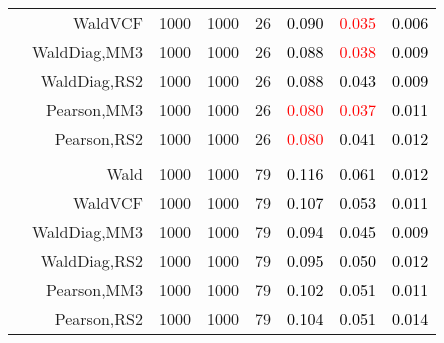 \documentclass[
]{article}
\begin{document}
\begin{table}[H]
{\begin{tabular}[t]{lrrrrrrr}
\hspace{1em} & WaldVCF & 1000 & 1000 & 26 & \textcolor{black}{0.090} & \textcolor{red}{0.035} & \textcolor{black}{0.006}\\

\hspace{1em} & WaldDiag,MM3 & 1000 & 1000 & 26 & \textcolor{black}{0.088} & \textcolor{red}{0.038} & \textcolor{black}{0.009}\\

\hspace{1em} & WaldDiag,RS2 & 1000 & 1000 & 26 & \textcolor{black}{0.088} & \textcolor{black}{0.043} & \textcolor{black}{0.009}\\

\hspace{1em} & Pearson,MM3 & 1000 & 1000 & 26 & \textcolor{red}{0.080} & \textcolor{red}{0.037} & \textcolor{black}{0.011}\\

\hspace{1em} & Pearson,RS2 & 1000 & 1000 & 26 & \textcolor{red}{0.080} & \textcolor{black}{0.041} & \textcolor{black}{0.012}\\
\cmidrule{1-8}
\addlinespace[0.3em]
\multicolumn{8}{l}{\textbf{3F 15V}}\\
\hspace{1em} & Wald & 1000 & 1000 & 79 & \textcolor{black}{0.116} & \textcolor{black}{0.061} & \textcolor{black}{0.012}\\

\hspace{1em} & WaldVCF & 1000 & 1000 & 79 & \textcolor{black}{0.107} & \textcolor{black}{0.053} & \textcolor{black}{0.011}\\

\hspace{1em} & WaldDiag,MM3 & 1000 & 1000 & 79 & \textcolor{black}{0.094} & \textcolor{black}{0.045} & \textcolor{black}{0.009}\\

\hspace{1em} & WaldDiag,RS2 & 1000 & 1000 & 79 & \textcolor{black}{0.095} & \textcolor{black}{0.050} & \textcolor{black}{0.012}\\

\hspace{1em} & Pearson,MM3 & 1000 & 1000 & 79 & \textcolor{black}{0.102} & \textcolor{black}{0.051} & \textcolor{black}{0.011}\\

\hspace{1em} & Pearson,RS2 & 1000 & 1000 & 79 & \textcolor{black}{0.104} & \textcolor{black}{0.051} & \textcolor{black}{0.014}\\
\bottomrule
\end{tabular}}
\endgroup{}
\end{table}
\end{document}
